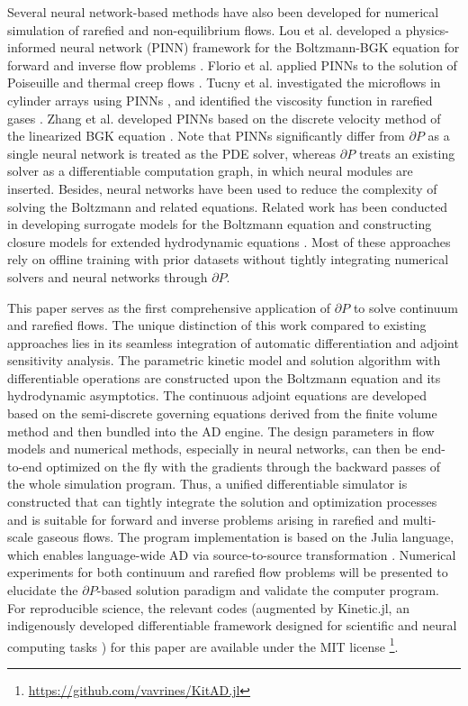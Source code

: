 \documentclass[preprint,3p,12pt,sort&compress]{elsarticle}
\begin{document}
Several neural network-based methods have also been developed for numerical simulation of rarefied and non-equilibrium flows.
Lou et al. developed a physics-informed neural network (PINN) framework for the Boltzmann-BGK equation for forward and inverse flow problems \cite{lou2021physics}.
Florio et al. applied PINNs to the solution of Poiseuille and thermal creep flows \cite{de2021physics,de2022physics}.
Tucny et al. investigated the microflows in cylinder arrays using PINNs \cite{tucny2025physics}, and identified the viscosity function in rarefied gases \cite{tucny2024learning}.
Zhang et al. developed PINNs based on the discrete velocity method of the linearized BGK equation \cite{zhang2023simulation}.
Note that PINNs significantly differ from $\partial P$ as a single neural network is treated as the PDE solver, whereas $\partial P$ treats an existing solver as a differentiable computation graph, in which neural modules are inserted.
Besides, neural networks have been used to reduce the complexity of solving the Boltzmann and related equations.
Related work has been conducted in developing surrogate models for the Boltzmann equation \cite{xiao2021using,miller2022neural,li2024solving} and constructing closure models for extended hydrodynamic equations \cite{huang2022machine,schotthofer2022structure,han2019uniformly,christlieb2025hyperbolic}.
Most of these approaches rely on offline training with prior datasets without tightly integrating numerical solvers and neural networks through $\partial P$.

This paper serves as the first comprehensive application of $\partial P$ to solve continuum and rarefied flows.
The unique distinction of this work compared to existing approaches lies in its seamless integration of automatic differentiation and adjoint sensitivity analysis.
The parametric kinetic model and solution algorithm with differentiable operations are constructed upon the Boltzmann equation and its hydrodynamic asymptotics. 
The continuous adjoint equations are developed based on the semi-discrete
governing equations derived from the finite volume method and then bundled into the AD engine. 
The design parameters in flow models and numerical methods, especially in neural networks, can then be end-to-end optimized on the fly with the gradients through the backward passes of the whole simulation program.
Thus, a unified differentiable simulator is constructed that can tightly integrate the solution and optimization processes and is suitable for forward and inverse problems arising in rarefied and multi-scale gaseous flows.
The program implementation is based on the Julia language, which enables language-wide AD via source-to-source transformation \cite{innes2019differentiable,moses2020instead}.
Numerical experiments for both continuum and rarefied flow problems will be presented to elucidate the $\partial P$-based solution paradigm and validate the computer program.
For reproducible science, the relevant codes (augmented by Kinetic.jl, an indigenously developed differentiable framework designed for scientific and neural computing tasks \cite{xiao2021kinetic}) for this paper are available under the MIT license \footnote{\url{https://github.com/vavrines/KitAD.jl}}.
\end{document}
